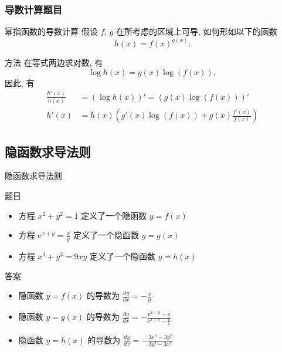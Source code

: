 \documentclass[
10pt,
aspectratio=43,
]{beamer}
\begin{document}
\begin{frame}
	\frametitle{导数计算题目}
	\begin{block}{幂指函数的导数计算}
		假设 $f$, $g$ 在所考虑的区域上可导, 如何形如以下的函数
		\[
			h(x)=f(x)^{g(x)}.
		\]
	\end{block}

	\pause

	\begin{exampleblock}{方法}
		在等式两边求对数, 有
		\[
			\log h(x) = g(x)\log (f(x)),
		\]
		因此, 有
		\begin{align*}
			\displaystyle\frac{h'(x)}{h(x)} & =(\log h(x))' = (g(x)\log (f(x)))'                                     \\
			h'(x)                           & =\displaystyle h(x)\left(g'(x)\log(f(x))+g(x)\frac{f'(x)}{f(x)}\right)
		\end{align*}
	\end{exampleblock}
\end{frame}

\subsection{隐函数求导法则}
\begin{frame}{隐函数求导法则}
	\begin{block}{题目}
		\begin{itemize}
			\item 方程 $x^2 + y^2 = 1$ 定义了一个隐函数 $y = f(x)$
			\item 方程 $\displaystyle\mathrm{e}^{x+y}=\frac{x}{y}$ 定义了一个隐函数 $y = g(x)$
			\item 方程 $x^3 + y^3 = 9xy$ 定义了一个隐函数 $y = h(x)$
		\end{itemize}
	\end{block}

	\pause

	\begin{exampleblock}{答案}
		\begin{itemize}
			\item 隐函数 $y = f(x)$ 的导数为 $\displaystyle\frac{{dy}}{{dx}} = -\frac{{x}}{{y}}$
			\item 隐函数 $y = g(x)$ 的导数为 $\displaystyle\frac{{dy}}{{dx}} = -\frac{{\mathrm{e}^{x+y}-y}}{{\mathrm{e}^{x+y}-\frac{x}{y}}}$
			\item 隐函数 $y = h(x)$ 的导数为 $\displaystyle\frac{{dy}}{{dx}} = -\frac{{3x^2 - 3y^2}}{{3y^2 - 3x^2}}$
		\end{itemize}
	\end{exampleblock}
\end{frame}
\end{document}

